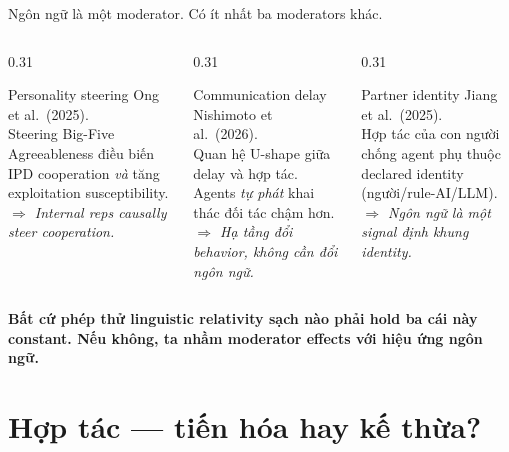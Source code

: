 \documentclass[11pt,aspectratio=169]{beamer}
\newcommand{\takeaway}[1]{%
  \begin{center}
    \colorbox{rsnavy!10}{%
      \begin{minipage}{0.92\textwidth}
        \centering\textbf{#1}
      \end{minipage}}
  \end{center}}
\begin{document}
\begin{frame}{Ngôn ngữ là một moderator. Có ít nhất ba moderators khác.}
    \large
    \begin{columns}[T]
        \begin{column}{0.31\textwidth}
            \begin{block}{Personality steering}
                \footnotesize Ong et al.\ (2025).\\
                Steering Big-Five Agreeableness điều biến IPD cooperation \emph{và} tăng exploitation susceptibility.\\[4pt]
                \textit{$\Rightarrow$ Internal reps causally steer cooperation.}
            \end{block}
        \end{column}
        \begin{column}{0.31\textwidth}
            \begin{block}{Communication delay}
                \footnotesize Nishimoto et al.\ (2026).\\
                Quan hệ U-shape giữa delay và hợp tác. Agents \emph{tự phát} khai thác đối tác chậm hơn.\\[4pt]
                \textit{$\Rightarrow$ Hạ tầng đổi behavior, không cần đổi ngôn ngữ.}
            \end{block}
        \end{column}
        \begin{column}{0.31\textwidth}
            \begin{block}{Partner identity}
                \footnotesize Jiang et al.\ (2025).\\
                Hợp tác của con người chống agent phụ thuộc declared identity (người/rule-AI/LLM).\\[4pt]
                \textit{$\Rightarrow$ Ngôn ngữ là một signal định khung identity.}
            \end{block}
        \end{column}
    \end{columns}
    \vspace{0.4cm}
    \takeaway{Bất cứ phép thử linguistic relativity sạch nào phải hold ba cái này constant. Nếu không, ta nhầm moderator effects với hiệu ứng ngôn ngữ.}
\end{frame}

\section{Hợp tác --- tiến hóa hay kế thừa?}
\end{document}
